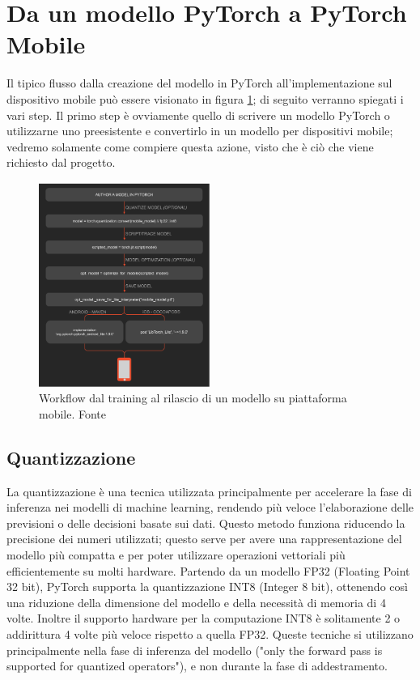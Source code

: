 \section{Da un modello PyTorch a PyTorch Mobile}
Il tipico flusso dalla creazione del modello in PyTorch all'implementazione sul dispositivo mobile può essere visionato in figura \ref{fig:pyworkflow}; di seguito
verranno spiegati i vari step. Il primo step è ovviamente quello di scrivere un modello PyTorch o utilizzarne uno preesistente e convertirlo in un modello per dispositivi mobile; vedremo
solamente come compiere questa azione, visto che è ciò che viene richiesto dal progetto.

\begin{figure}[ht]
    \centering
    \includegraphics[width=0.5\textwidth]{Immagini/workflow_pytorch.png}
    \caption{Workflow dal training al rilascio di un modello su piattaforma mobile. Fonte \cite{PyTorchOfficial}}
    \label{fig:pyworkflow}
\end{figure}

\subsection{Quantizzazione}
La quantizzazione\cite{Quantizzazione} è una tecnica utilizzata principalmente per accelerare la fase di inferenza nei modelli di machine learning,
rendendo più veloce l'elaborazione delle previsioni o delle decisioni basate sui dati. Questo metodo funziona riducendo la precisione dei numeri utilizzati;
questo serve per avere una rappresentazione del modello più compatta e per poter utilizzare operazioni vettoriali più efficientemente su molti hardware.
Partendo da un modello FP32 (Floating Point 32 bit), PyTorch supporta la quantizzazione INT8 (Integer 8 bit), ottenendo così una riduzione della dimensione
del modello e della necessità di memoria di 4 volte. Inoltre il supporto hardware per la computazione INT8 è solitamente 2 o addirittura 4 volte più veloce
rispetto a quella FP32. Queste tecniche si utilizzano principalmente nella fase di inferenza del modello ("only the forward pass is supported for quantized operators"),
e non durante la fase di addestramento.

